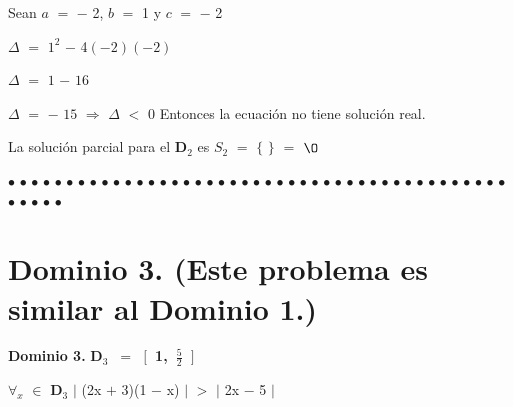 \documentclass[12pt]{article}
\newenvironment{MyColorPar}[1]{%
    \leavevmode\color{#1}\ignorespaces%
}{%
}%
\begin{document}
Sean $a$ $=$ $-$ 2, \hspace{0.3cm} $b$ $=$ 1 \hspace{0.3cm} y \hspace{0.3cm} $c$ $=$ $-$ 2 \vspace{0.3cm}

$\Delta$ $=$ $1^{2}$ $-$ 4$(- 2)$$(-2)$ \vspace{0.3cm}

$\Delta$ $=$ $1$ $-$ $16$ \vspace{0.3cm}

$\Delta$ $=$ $-$ $15$ \hspace{0.3cm} $\Longrightarrow$ \hspace{0.3cm} 
$\Delta$ $<$ $0$ \hspace{0.1cm} Entonces la ecuación no tiene solución real. \vspace{0.5cm}


La solución parcial para el {\bfseries{{\textcolor{Burnt Sienna}{\mbox{D$_{2}$}}}}} es $S_{2}$ $=$ $\big \{$  $\big \}$ $=$ $\O$ \vspace{0.4cm}

\begin{MyColorPar}{pakistangreen}
$\bullet$ $\bullet$ $\bullet$ $\bullet$ $\bullet$ $\bullet$ $\bullet$ $\bullet$ $\bullet$ $\bullet$ $\bullet$ $\bullet$ $\bullet$ $\bullet$ $\bullet$ $\bullet$ $\bullet$ $\bullet$ $\bullet$ $\bullet$ $\bullet$ $\bullet$ $\bullet$ $\bullet$ $\bullet$ $\bullet$ $\bullet$ $\bullet$ $\bullet$ $\bullet$ $\bullet$ $\bullet$ $\bullet$ $\bullet$ $\bullet$ $\bullet$ $\bullet$ $\bullet$ $\bullet$ $\bullet$ $\bullet$ $\bullet$ $\bullet$ $\bullet$ $\bullet$ $\bullet$ $\bullet$ $\bullet$ 
\end{MyColorPar} \vspace{.5cm}

\section*{{\textcolor{Tarawera}{\textsf{Dominio 3. (Este problema es similar al Dominio 1.)}}}}
\begin{MyColorPar}{Tarawera}
{\bfseries{Dominio 3.}}  {\bfseries{{\textcolor{Burnt Sienna}{\mbox{D$_{3}$ $=$ {$\Big[$}  1, {\Large{$\frac{5}{2}$}} {$\Big ]\ $}}}}}}
\end{MyColorPar} \vspace{0.5cm}

\hspace{4.5cm} $\forall$$_{x}$ $\in$  {\bfseries{{\textcolor{Burnt Sienna}{\mbox{D$_{3}$}}}}} \hspace{0.5cm} $\mid$ (2x $+$ 3)(1 $-$ x) $\mid$ $>$ $\mid$ 2x $-$ 5 $\mid$ \vspace{0.5cm}
\end{document}
